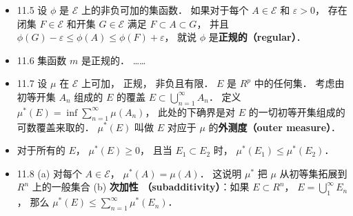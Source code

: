 \begin{itemize}
\item 11.5 设 $\phi$ 是 $\mathscr E$ 上的非负可加的集函数． 如果对于每个 $A\in \mathscr E$ 和 $\varepsilon>0$， 存在闭集 $F\in \mathscr E$ 和开集 $G\in\mathscr E$ 满足 $F\subset A\subset G$， 并且 $\phi(G)-\varepsilon \leqslant \phi(A) \leqslant \phi(F) + \varepsilon$， 就说 $\phi$ 是\textbf{正规的（regular）}．

\item 11.6 集函数 $m$ 是正规的． ……

\item 11.7 设 $\mu$ 在 $\mathscr E$ 上可加， 正规， 非负且有限． $E$ 是 $R^p$ 中的任何集． 考虑由初等开集 $A_n$ 组成的 $E$ 的覆盖 $E\subset \bigcup_{n=1}^\infty A_n$． 定义 $\mu^*(E) = \inf \sum_{n=1}^\infty \mu(A_n)$， 此处的下确界是对 $E$ 的一切初等开集组成的可数覆盖来取的． $\mu^*(E)$ 叫做 $E$ 对应于 $\mu$ 的\textbf{外测度（outer measure）}．

\item 对于所有的 $E$， $\mu^*(E)\geqslant 0$， 且当 $E_1\subset E_2$ 时， $\mu^*(E_1) \leqslant \mu^*(E_2)$．

\item 11.8 (a) 对每个 $A\in \mathscr E$， $\mu^*(A)=\mu(A)$． 这说明 $\mu^*$ 把 $\mu$ 从初等集拓展到 $R^n$ 上的一般集合 (b) \textbf{次加性 （subadditivity）}：如果 $E\subset R^n$， $E=\bigcup_1^\infty E_n$， 那么 $\mu^*(E)\leqslant \sum_{n=1}^\infty \mu^*(E_n)$．
\end{itemize}
